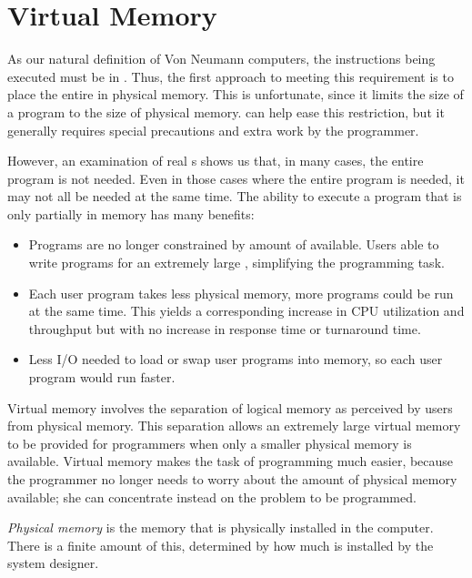 \section{Virtual Memory}\label{sec:Virtual_Memory}
As our natural definition of Von Neumann computers, the instructions being executed must be in .
Thus, the first approach to meeting this requirement is to place the entire  in physical memory.
This is unfortunate, since it limits the size of a program to the size of physical memory.
 can help ease this restriction, but it generally requires special precautions and extra work by the programmer.

However, an examination of real s shows us that, in many cases, the entire program is not needed.
Even in those cases where the entire program is needed, it may not all be needed at the same time.
The ability to execute a program that is only partially in memory has many benefits:
\begin{itemize}[noitemsep]
\item Programs are no longer constrained by amount of  available.
  Users able to write programs for an extremely large , simplifying the programming task.
\item Each user program takes less physical memory, more programs could be run at the same time.
  This yields a corresponding increase in CPU utilization and throughput but with no increase in response time or turnaround time.
\item Less I/O needed to load or swap user programs into memory, so each user program would run faster.
\end{itemize}

\begin{definition}\label{def:Virtual_Memory}
  Virtual memory involves the separation of logical memory as perceived
  by users from physical memory.
  This separation allows an extremely large virtual memory to be provided for programmers when only a smaller physical memory is available.
  Virtual memory makes the task of programming much easier, because the programmer no longer needs to worry about the amount of physical memory available; she can concentrate instead on the problem to be programmed.
\end{definition}

\begin{definition}\label{def:Physical_Memory}
  \emph{Physical memory} is the memory that is physically installed in the computer.
  There is a finite amount of this, determined by how much is installed by the system designer.
\end{definition}

